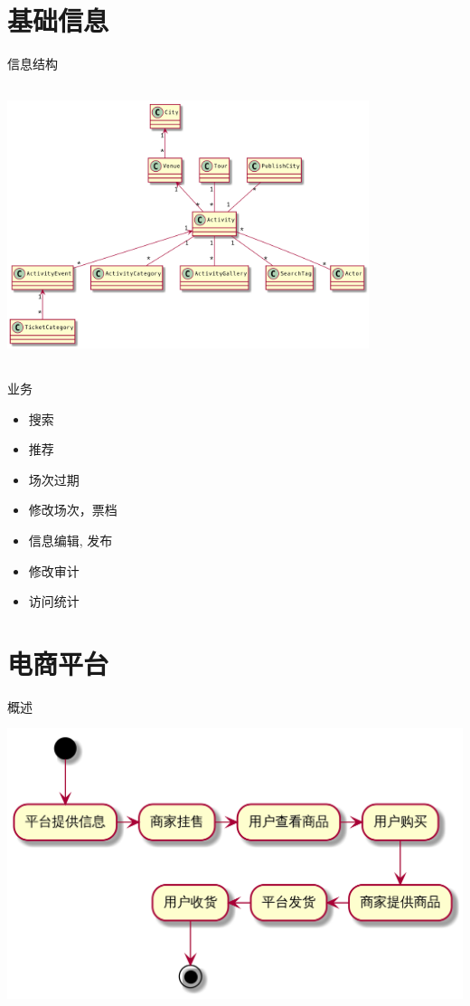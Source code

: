 \documentclass[presentation, bigger]{beamer}
\begin{document}
\section{基础信息}
\label{sec:org26f59f8}
\begin{frame}[label={sec:org436e5e2}]{信息结构}
\begin{center}
\includegraphics[width=300pt,height=230pt]{info-structure.png}
\end{center}
\end{frame}


\begin{frame}[label={sec:org44d4856}]{业务}
\begin{itemize}
\item 搜索
\item 推荐
\item 场次过期
\item 修改场次，票档
\item 信息编辑, 发布
\item 修改审计
\item 访问统计
\end{itemize}
\end{frame}

\section{电商平台}
\label{sec:org2f6ca98}
\begin{frame}[label={sec:org1695310}]{概述}
\begin{center}
\includegraphics[width=.9\linewidth]{trade-flow.png}
\end{center}
\end{frame}
\end{document}
